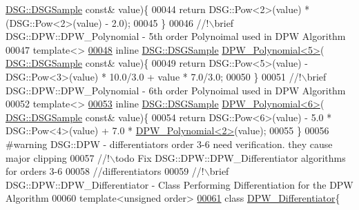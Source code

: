 \begin{DoxyCode}
      \hyperlink{namespace_d_s_g_ac39a94cd27ebcd9c1e7502d0c624894a}{DSG::DSGSample} \textcolor{keyword}{const}& value)\{
00044             \textcolor{keywordflow}{return} DSG::Pow<2>(value) * (DSG::Pow<2>(value) - 2.0);
00045         \}\textcolor{comment}{}
00046 \textcolor{comment}{        //!\(\backslash\)brief DSG::DPW::DPW\_Polynomial - 5th order Polynoimal used in DPW Algorithm}
00047 \textcolor{comment}{}        \textcolor{keyword}{template}<>
\hypertarget{_d_p_w_8h_source_l00048}{}\hyperlink{namespace_d_s_g_1_1_d_p_w_a1b04cfea475babd2006c84ba118c1909}{00048}         \textcolor{keyword}{inline} \hyperlink{namespace_d_s_g_ac39a94cd27ebcd9c1e7502d0c624894a}{DSG::DSGSample} \hyperlink{namespace_d_s_g_1_1_d_p_w_a1b04cfea475babd2006c84ba118c1909}{DPW\_Polynomial<5>}(
      \hyperlink{namespace_d_s_g_ac39a94cd27ebcd9c1e7502d0c624894a}{DSG::DSGSample} \textcolor{keyword}{const}& value)\{
00049             \textcolor{keywordflow}{return} DSG::Pow<5>(value) - DSG::Pow<3>(value) * 10.0/3.0 + value * 7.0/3.0;
00050         \}\textcolor{comment}{}
00051 \textcolor{comment}{        //!\(\backslash\)brief DSG::DPW::DPW\_Polynomial - 6th order Polynoimal used in DPW Algorithm}
00052 \textcolor{comment}{}        \textcolor{keyword}{template}<>
\hypertarget{_d_p_w_8h_source_l00053}{}\hyperlink{namespace_d_s_g_1_1_d_p_w_a0c0f87dd5176cd98f69c5ec46db50369}{00053}         \textcolor{keyword}{inline} \hyperlink{namespace_d_s_g_ac39a94cd27ebcd9c1e7502d0c624894a}{DSG::DSGSample} \hyperlink{namespace_d_s_g_1_1_d_p_w_a0c0f87dd5176cd98f69c5ec46db50369}{DPW\_Polynomial<6>}(
      \hyperlink{namespace_d_s_g_ac39a94cd27ebcd9c1e7502d0c624894a}{DSG::DSGSample} \textcolor{keyword}{const}& value)\{
00054             \textcolor{keywordflow}{return} DSG::Pow<6>(value) - 5.0 * DSG::Pow<4>(value) + 7.0 * 
      \hyperlink{namespace_d_s_g_1_1_d_p_w_a140753401d8518aa64bbcd7496a65b45}{DPW\_Polynomial<2>}(value);
00055         \}
00056 \textcolor{preprocessor}{#warning DSG::DPW - differentiators order 3-6 need verification. they cause major clipping}
00057 \textcolor{comment}{        //!\(\backslash\)todo Fix DSG::DPW::DPW\_Differentiator algorithms for orders 3-6}
00058 \textcolor{comment}{}        \textcolor{comment}{//differentiators}\textcolor{comment}{}
00059 \textcolor{comment}{        //!\(\backslash\)brief DSG::DPW::DPW\_Differentiator - Class Performing Differentiation for the DPW Algorithm}
00060 \textcolor{comment}{}        \textcolor{keyword}{template}<\textcolor{keywordtype}{unsigned} order>
\hypertarget{_d_p_w_8h_source_l00061}{}\hyperlink{class_d_s_g_1_1_d_p_w_1_1_d_p_w___differentiator}{00061}         \textcolor{keyword}{class }\hyperlink{class_d_s_g_1_1_d_p_w_1_1_d_p_w___differentiator}{DPW\_Differentiator}\{

\end{DoxyCode}
